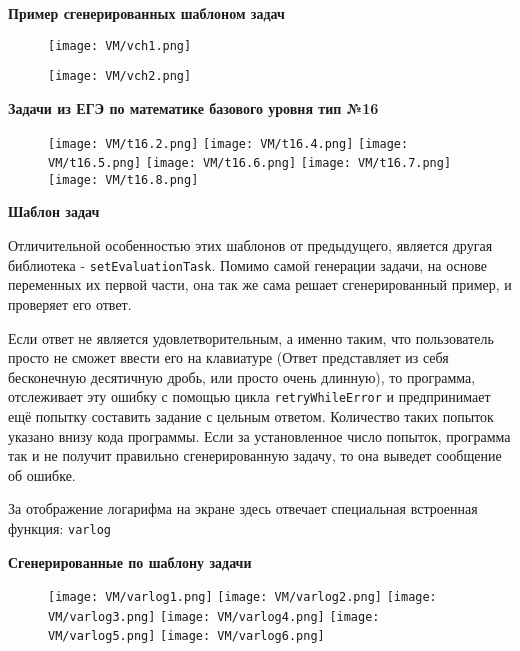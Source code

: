 \textbf{ Пример сгенерированных шаблоном задач}

 	\begin{figure}[h]
		\centering
		\texttt{[image: VM/vch1.png]}
		 		\end{figure}
		 	\begin{figure}[h]
		\centering
		\texttt{[image: VM/vch2.png]}
	\end{figure}

\textbf{Задачи из ЕГЭ по математике базового уровня тип №16}

	\begin{figure}[h]
		\centering
		\texttt{[image: VM/t16.2.png]}
		\texttt{[image: VM/t16.4.png]}
		\texttt{[image: VM/t16.5.png]}
		\texttt{[image: VM/t16.6.png]}
		\texttt{[image: VM/t16.7.png]}
		\texttt{[image: VM/t16.8.png]}
\end{figure}
	
\textbf{Шаблон задач}


	
Отличительной особенностью этих шаблонов от предыдущего, является другая библиотека - \texttt{setEvaluationTask}. Помимо самой генерации задачи, на основе переменных их первой части, она так же сама решает сгенерированный пример, и проверяет его ответ. 

Если ответ не является удовлетворительным, а именно таким, что пользователь просто не сможет ввести его на клавиатуре (Ответ представляет из себя бесконечную десятичную дробь, или просто очень длинную), то программа, отслеживает эту ошибку с помощью цикла \texttt{retryWhileError} и предпринимает ещё попытку составить задание с цельным ответом. Количество таких попыток указано внизу кода программы. Если за установленное число попыток, программа так и не получит правильно сгенерированную задачу, то она выведет сообщение об ошибке.

За отображение логарифма на экране здесь отвечает специальная встроенная функция: \texttt{varlog}

\textbf{Сгенерированные по шаблону задачи}

\begin{figure}[h]
		\centering
		\texttt{[image: VM/varlog1.png]}
		\texttt{[image: VM/varlog2.png]}
		\texttt{[image: VM/varlog3.png]}
		\texttt{[image: VM/varlog4.png]}
		\texttt{[image: VM/varlog5.png]}
		\texttt{[image: VM/varlog6.png]}
\end{figure}


